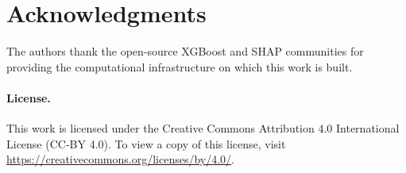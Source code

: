\documentclass[11pt]{article}
\begin{document}
\section*{Acknowledgments}

The authors thank the open-source XGBoost and SHAP communities for
providing the computational infrastructure on which this work is built.

\paragraph{License.}
This work is licensed under the Creative Commons Attribution 4.0
International License (CC-BY 4.0). To view a copy of this license, visit
\url{https://creativecommons.org/licenses/by/4.0/}.



% 
\end{document}
